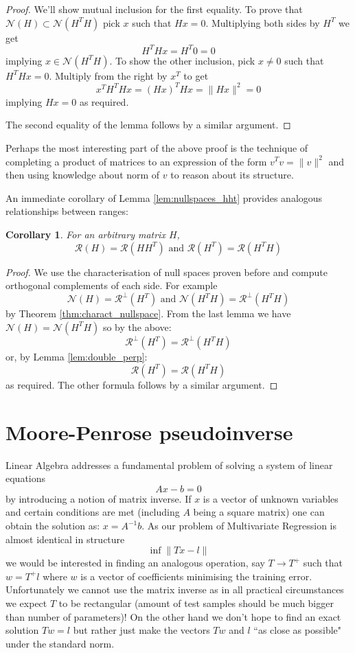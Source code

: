 \documentclass[a4paper]{article}
\theoremstyle{break}
\newtheorem{corollary}{Corollary}[theorem]
\newcommand{\Nu}{\mathcal{N}}
\newcommand{\Ra}{\mathcal{R}}
\begin{document}
\begin{proof}
    We'll show mutual inclusion for the first equality. To prove that $\Nu(H) \subset \Nu(H^T H)$ pick $x$ such that $H x = 0$. Multiplying both sides by $H^T$ we get
    $$ H^T H x = H^T 0 = 0 $$
    implying $x \in \Nu(H^T H) $.
    To show the other inclusion, pick $x \neq 0$ such that $H^T H x = 0$. Multiply from the right by $x^T$ to get
    $$ x^T H^T H x = (H x)^T H x = \| H x \|^2 = 0 $$
    implying $ H x =0 $ as required.
    
    The second equality of the lemma follows by a similar argument.
\end{proof}

Perhaps the most interesting part of the above proof is the technique of completing a product of matrices to an expression of the form $v^T v = \| v \|^2 $ and then using knowledge about norm of $v$ to reason about its structure.

An immediate corollary of Lemma \ref{lem:nullspaces_hht} provides analogous relationships between ranges:

\begin{corollary}\label{cor:equal_ranges}
    For an arbitrary matrix $H$,
    $$\Ra(H) = \Ra(H H^T) \text{ and } \Ra(H^T) = \Ra(H^T H)$$
\end{corollary}

\begin{proof}
    We use the characterisation of null spaces proven before and compute orthogonal complements of each side. For example
    $$ \Nu(H) = \Ra^\perp (H^T) \text{ and } \Nu(H^T H) = \Ra^\perp ( H^T H )$$
    by Theorem \ref{thm:charact_nullspace}. From the last lemma we have
    $ \Nu(H) = \Nu(H^T H) $ so by the above:
    $$ \Ra^\perp (H^T) = \Ra^\perp ( H^T H ) $$
    or, by Lemma \ref{lem:double_perp}:
    $$ \Ra (H^T) = \Ra( H^T H ) $$
    as required. The other formula follows by a similar argument.
\end{proof}


\section{Moore-Penrose pseudoinverse}
Linear Algebra addresses a fundamental problem of solving a system of linear equations
$$ A x - b = 0$$
by introducing a notion of matrix inverse. If $x$ is a vector of unknown variables and certain conditions are met (including $A$ being a square matrix) one can obtain the solution as: $ x = A^{-1} b $. As our problem of Multivariate Regression is almost identical in structure
$$ \inf \| T x - l \| $$
we would be interested in finding an analogous operation, say $ T \to T^+$ such that $ w = T^+ l$ where $w$ is a vector of coefficients minimising the training error. Unfortunately we cannot use the matrix inverse as in all practical circumstances we expect $T$ to be rectangular (amount of test samples should be much bigger than number of parameters)! On the other hand we don't hope to find an exact solution $ T w = l$ but rather just make the vectors $T w$ and $l$ ``as close as possible" under the standard norm.
\end{document}
